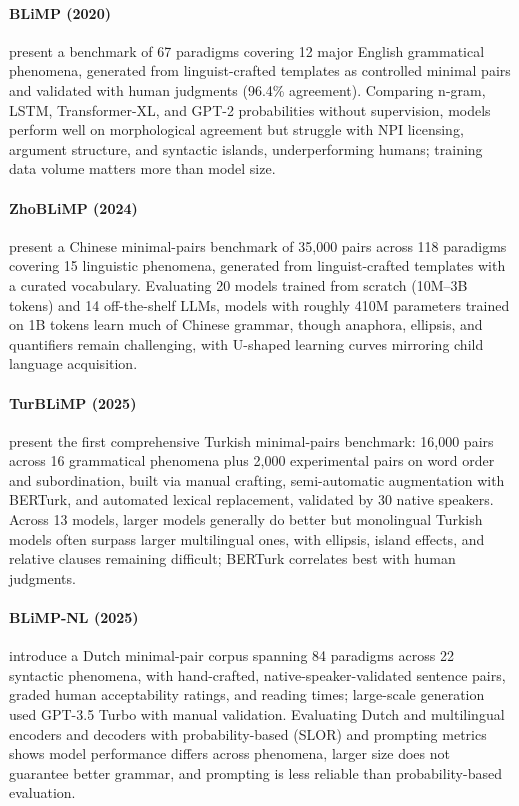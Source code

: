 \documentclass[letterpaper]{article}
\begin{document}
\paragraph{BLiMP (2020)} \citet{warstadt2020blimp} present a benchmark of 67 paradigms covering 12 major English grammatical phenomena, generated from linguist-crafted templates as controlled minimal pairs and validated with human judgments (96.4\% agreement). Comparing n-gram, LSTM, Transformer-XL, and GPT-2 probabilities without supervision, models perform well on morphological agreement but struggle with NPI licensing, argument structure, and syntactic islands, underperforming humans; training data volume matters more than model size.

\paragraph{ZhoBLiMP (2024)} \citet{liu2024zhoblimpsystematicassessmentlanguage} present a Chinese minimal-pairs benchmark of 35,000 pairs across 118 paradigms covering 15 linguistic phenomena, generated from linguist-crafted templates with a curated vocabulary. Evaluating 20 models trained from scratch (10M--3B tokens) and 14 off-the-shelf LLMs, models with roughly 410M parameters trained on 1B tokens learn much of Chinese grammar, though anaphora, ellipsis, and quantifiers remain challenging, with U-shaped learning curves mirroring child language acquisition.

\paragraph{TurBLiMP (2025)} \citet{basar2025turblimp} present the first comprehensive Turkish minimal-pairs benchmark: 16,000 pairs across 16 grammatical phenomena plus 2,000 experimental pairs on word order and subordination, built via manual crafting, semi-automatic augmentation with BERTurk, and automated lexical replacement, validated by 30 native speakers. Across 13 models, larger models generally do better but monolingual Turkish models often surpass larger multilingual ones, with ellipsis, island effects, and relative clauses remaining difficult; BERTurk correlates best with human judgments.

\paragraph{BLiMP-NL (2025)} \citet{frank_suijkerbuijk_prins_de_heer_kloots_zuidema_2025} introduce a Dutch minimal-pair corpus spanning 84 paradigms across 22 syntactic phenomena, with hand-crafted, native-speaker-validated sentence pairs, graded human acceptability ratings, and reading times; large-scale generation used GPT-3.5 Turbo with manual validation. Evaluating Dutch and multilingual encoders and decoders with probability-based (SLOR) and prompting metrics shows model performance differs across phenomena, larger size does not guarantee better grammar, and prompting is less reliable than probability-based evaluation.
\end{document}
